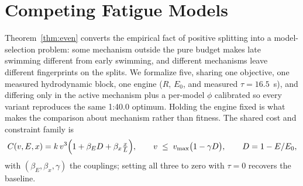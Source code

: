 \section{Competing Fatigue Models}\label{sec:competing}

Theorem~\ref{thm:even} converts the empirical fact of positive splitting
into a model-selection problem: some mechanism outside the pure budget makes
late swimming different from early swimming, and different mechanisms leave
different fingerprints on the splits. We formalize five, sharing one
objective, one measured hydrodynamic block, one engine
($R$, $E_0$, and measured $\tau = 16.5$~s), and differing only in the active
mechanism plus a per-model $\phi$ calibrated so every variant reproduces the
same 1:40.0 optimum. Holding the engine fixed is what makes the comparison
about mechanism rather than fitness. The shared cost and constraint family is
\begin{equation}
  C(v, E, x) = k\,v^{3}\Big(1 + \beta_E D + \beta_x \tfrac{x}{L}\Big),
  \qquad
  v \;\le\; v_{\max}\big(1 - \gamma D\big),
  \qquad
  D = 1 - E/E_0 ,
  \label{eq:family}
\end{equation}
with $(\beta_E, \beta_x, \gamma)$ the couplings; setting all three to zero
with $\tau = 0$ recovers the baseline.

